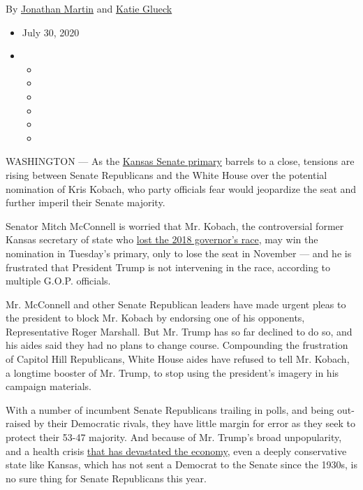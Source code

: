 By \href{https://www.nytimes.com/by/jonathan-martin}{Jonathan Martin}
and \href{https://www.nytimes.com/by/katie-glueck}{Katie Glueck}

\begin{itemize}
\item
  July 30, 2020
\item
  \begin{itemize}
  \item
  \item
  \item
  \item
  \item
  \item
  \end{itemize}
\end{itemize}

WASHINGTON --- As the
\href{https://www.nytimes.com/2020/08/04/us/elections/primary-election-michigan-arizona-kansas.html}{Kansas
Senate primary} barrels to a close, tensions are rising between Senate
Republicans and the White House over the potential nomination of Kris
Kobach, who party officials fear would jeopardize the seat and further
imperil their Senate majority.

Senator Mitch McConnell is worried that Mr. Kobach, the controversial
former Kansas secretary of state who
\href{https://www.nytimes.com/2018/11/06/us/laura-kelly-wins-kansas-governors-race.html}{lost
the 2018 governor's race}, may win the nomination in Tuesday's primary,
only to lose the seat in November --- and he is frustrated that
President Trump is not intervening in the race, according to multiple
G.O.P. officials.

Mr. McConnell and other Senate Republican leaders have made urgent pleas
to the president to block Mr. Kobach by endorsing one of his opponents,
Representative Roger Marshall. But Mr. Trump has so far declined to do
so, and his aides said they had no plans to change course. Compounding
the frustration of Capitol Hill Republicans, White House aides have
refused to tell Mr. Kobach, a longtime booster of Mr. Trump, to stop
using the president's imagery in his campaign materials.

With a number of incumbent Senate Republicans trailing in polls, and
being out-raised by their Democratic rivals, they have little margin for
error as they seek to protect their 53-47 majority. And because of Mr.
Trump's broad unpopularity, and a health crisis
\href{https://www.nytimes.com/2020/07/30/business/economy/q2-gdp-coronavirus-economy.html?action=click\&module=Top\%20Stories\&pgtype=Homepage}{that
has devastated the economy}, even a deeply conservative state like
Kansas, which has not sent a Democrat to the Senate since the 1930s, is
no sure thing for Senate Republicans this year.

